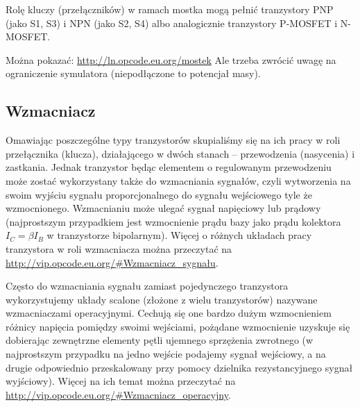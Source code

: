 \documentclass{pdfBooklets}
\begin{document}
Rolę kluczy (przełączników) w ramach mostka mogą pełnić tranzystory PNP (jako S1, S3) i NPN (jako S2, S4) albo analogicznie tranzystory P-MOSFET i N-MOSFET.

\begin{teacherOnly}
Można pokazać: \url{http://ln.opcode.eu.org/mostek}
Ale trzeba zwrócić uwagę na ograniczenie symulatora (niepodłączone to potencjał masy).
\end{teacherOnly}

\subsection{Wzmacniacz}

Omawiając poszczególne typy tranzystorów skupialiśmy się na ich pracy w roli przełącznika (klucza), działającego w dwóch stanach – przewodzenia (nasycenia) i zastkania.
Jednak tranzystor będąc elementem o regulowanym przewodzeniu może zostać wykorzystany także do wzmacniania sygnałów, czyli wytworzenia na swoim wyjściu sygnału proporcjonalnego do sygnału wejściowego tyle że wzmocnionego.
Wzmacnianiu może ulegać sygnał napięciowy lub prądowy (najprostszym przypadkiem jest wzmocnienie prądu bazy jako prądu kolektora $I_C = \beta I_B$ w tranzystorze bipolarnym).
Więcej o różnych układach pracy tranzystora w roli wzmacniacza można przeczytać na \url{http://vip.opcode.eu.org/#Wzmacniacz_sygnału}.

Często do wzmacniania sygnału zamiast pojedynczego tranzystora wykorzystujemy układy scalone (złożone z wielu tranzystorów) nazywane wzmacniaczami operacyjnymi.
Cechują się one bardzo dużym wzmocnieniem różnicy napięcia pomiędzy swoimi wejściami, pożądane wzmocnienie uzyskuje się dobierając zewnętrzne elementy pętli ujemnego sprzężenia zwrotnego
	(w najprostszym przypadku na jedno wejście podajemy sygnał wejściowy, a na drugie odpowiednio przeskalowany przy pomocy dzielnika rezystancyjnego sygnał wyjściowy).
Więcej na ich temat można przeczytać na \url{http://vip.opcode.eu.org/#Wzmacniacz_operacyjny}.
\end{document}
